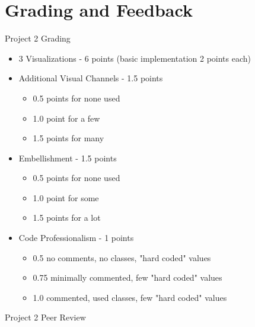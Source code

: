 \documentclass[a4paper,12pt]{article}
\begin{document}

\section{Grading and Feedback}

\feedback


\begin{center}
{\huge Project 2 Grading}
\end{center}

\begin{itemize}
	\item 3 Visualizations - 6 points (basic implementation 2 points each)
	\item Additional Visual Channels - 1.5 points 
		\begin{itemize}
    		\item 0.5 points for none used
    		\item 1.0 point for a few
            \item 1.5 points for many
		\end{itemize}
	\item Embellishment - 1.5 points 
		\begin{itemize}
    		\item 0.5 points for none used
    		\item 1.0 point for some
            \item 1.5 points for a lot
		\end{itemize}
	\item Code Professionalism - 1 points
		\begin{itemize}
            \item 0.5 no comments, no classes, "hard coded" values
            \item 0.75 minimally commented, few "hard coded" values
            \item 1.0 commented, used classes, few "hard coded" values
		\end{itemize}
\end{itemize}




\newpage


\begin{center}
{\huge Project 2 Peer Review}
\end{center}




\end{document}
